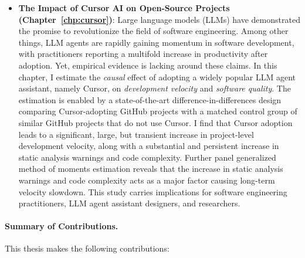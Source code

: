 \begin{itemize}[leftmargin=15pt]
    This study has implications for platform moderators, open-source practitioners, and supply chain security researchers.
    \item \textbf{The Impact of Cursor AI on Open-Source Projects (Chapter~\ref{chp:cursor})}:   Large language models (LLMs) have demonstrated the promise to revolutionize the field of software engineering.
    Among other things, LLM agents are rapidly gaining momentum in software development, with practitioners reporting a multifold increase in productivity after adoption.
    Yet, empirical evidence is lacking around these claims.
    In this chapter, I estimate the \emph{causal} effect of adopting a widely popular LLM agent assistant, namely Cursor, on \emph{development velocity} and \emph{software quality}.
    The estimation is enabled by a state-of-the-art difference-in-differences design comparing Cursor-adopting GitHub projects with a matched control group of similar GitHub projects that do not use Cursor. 
    I find that Cursor adoption leads to a significant, large, but transient increase in project-level development velocity, along with a substantial and persistent increase in static analysis warnings and code complexity.
    Further panel generalized method of moments estimation reveals that the increase in static analysis warnings and code complexity acts as a major factor causing long-term velocity slowdown.
    This study carries implications for software engineering practitioners, LLM agent assistant designers, and researchers. 
\end{itemize}

\paragraph{Summary of Contributions.} This thesis makes the following contributions:

